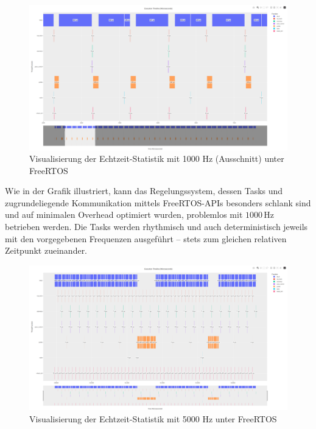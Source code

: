 \begin{figure}[H]
    \centering
    \includegraphics[width=1\textwidth]{assets/freertos_profiling_1000hz_ausschnitt}
    \caption{Visualisierung der Echtzeit-Statistik mit 1000 Hz (Ausschnitt)
    unter FreeRTOS}
\end{figure}

Wie in der Grafik illustriert, kann das Regelungssystem, dessen Tasks und
zugrundeliegende Kommunikation mittels FreeRTOS-APIs besonders schlank sind und
auf minimalen Overhead optimiert wurden, problemlos mit $1000\,\text{Hz}$
betrieben werden. Die Tasks werden rhythmisch und auch deterministisch jeweils
mit den vorgegebenen Frequenzen ausgeführt -- stets zum gleichen relativen
Zeitpunkt zueinander.

\begin{figure}[H]
    \centering
    \includegraphics[width=1\textwidth]{assets/freertos_profiling_5000hz}
    \caption{Visualisierung der Echtzeit-Statistik mit 5000 Hz unter FreeRTOS}
\end{figure}

